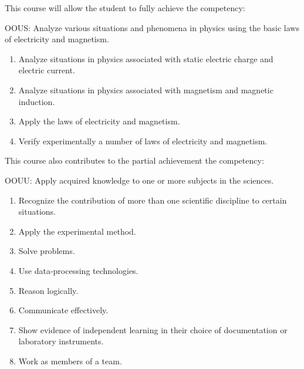 {This course will allow the student to fully achieve the competency:

OOUS: Analyze various situations and phenomena in physics using the basic laws of electricity and magnetism.
\begin{enumerate}
\item Analyze situations in physics associated with static electric charge and electric current.
\item Analyze situations in physics associated with magnetism and magnetic induction.
\item Apply the laws of electricity and magnetism.
\item Verify experimentally a number of laws of electricity and magnetism.
\end{enumerate}
\smallskip
This course also contributes to the partial achievement the competency:

OOUU:	Apply acquired knowledge to one or more subjects in the sciences.
\begin{enumerate}
\item Recognize the contribution of more than one scientific discipline to certain situations.
\item Apply the experimental method.
\item Solve problems.
\item Use data-processing technologies.
\item Reason logically.
\item Communicate effectively.
\item Show evidence of independent learning in their choice of documentation or laboratory instruments.
\item Work as members of a team.
\end{enumerate}
}
